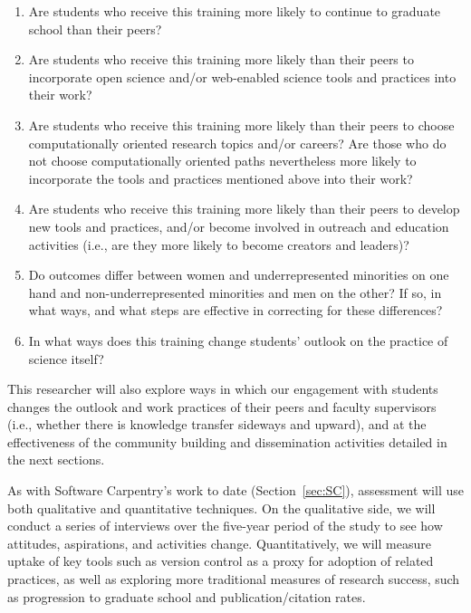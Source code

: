\documentclass{proposalnsf}
\newlength{\up}
\begin{document}
\begin{enumerate}
\item
  Are students who receive this training more likely to continue to
  graduate school than their peers?

\item
  Are students who receive this training more likely than their peers
  to incorporate open science and/or web-enabled science tools and
  practices into their work?

\item
  Are students who receive this training more likely than their peers
  to choose computationally oriented research topics and/or careers?
  Are those who do not choose computationally oriented paths
  nevertheless more likely to incorporate the tools and practices
  mentioned above into their work?

\item
  Are students who receive this training more likely than their peers
  to develop new tools and practices, and/or become involved in
  outreach and education activities (i.e., are they more likely to
  become creators and leaders)?

\item
  Do outcomes differ between women and underrepresented minorities on
  one hand and non-underrepresented minorities and men on the other?
  If so, in what ways, and what steps are effective in correcting for
  these differences?

\item
  In what ways does this training change students' outlook on the
  practice of science itself?

\end{enumerate}

This researcher will also explore ways in which our engagement with
students changes the outlook and work practices of their peers and
faculty supervisors (i.e., whether there is knowledge transfer
sideways and upward), and at the effectiveness of the community
building and dissemination activities detailed in the next sections. 

As with Software Carpentry's work to date (Section~\ref{sec:SC}),
assessment will use both qualitative and quantitative techniques.  On
the qualitative side, we will conduct a series of interviews over the
five-year period of the study to see how attitudes, aspirations, and
activities change. Quantitatively, we will measure uptake of key
tools such as version control as a proxy for adoption of related
practices, as well as exploring more traditional measures of research
success, such as progression to graduate school and
publication/citation rates. 
\end{document}
